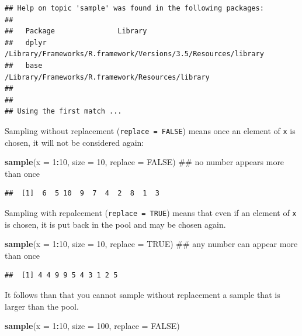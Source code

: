 \documentclass[]{book}
\newenvironment{Shaded}{\begin{snugshade}}{\end{snugshade}}
\newcommand{\KeywordTok}[1]{\textcolor[rgb]{0.13,0.29,0.53}{\textbf{#1}}}
\newcommand{\DataTypeTok}[1]{\textcolor[rgb]{0.13,0.29,0.53}{#1}}
\newcommand{\DecValTok}[1]{\textcolor[rgb]{0.00,0.00,0.81}{#1}}
\newcommand{\OtherTok}[1]{\textcolor[rgb]{0.56,0.35,0.01}{#1}}
\newcommand{\OperatorTok}[1]{\textcolor[rgb]{0.81,0.36,0.00}{\textbf{#1}}}
\newcommand{\NormalTok}[1]{#1}
\theoremstyle{definition}
\theoremstyle{definition}
\theoremstyle{definition}
\theoremstyle{remark}
\begin{document}
\begin{verbatim}
## Help on topic 'sample' was found in the following packages:
## 
##   Package               Library
##   dplyr                 /Library/Frameworks/R.framework/Versions/3.5/Resources/library
##   base                  /Library/Frameworks/R.framework/Resources/library
## 
## 
## Using the first match ...
\end{verbatim}

Sampling without replacement (\texttt{replace\ =\ FALSE}) means once an
element of \texttt{x} is chosen, it will not be considered again:

\begin{Shaded}
\begin{Highlighting}[]
\KeywordTok{sample}\NormalTok{(}\DataTypeTok{x =} \DecValTok{1}\OperatorTok{:}\DecValTok{10}\NormalTok{, }\DataTypeTok{size =} \DecValTok{10}\NormalTok{, }\DataTypeTok{replace =} \OtherTok{FALSE}\NormalTok{) ## no number appears more than once}
\end{Highlighting}
\end{Shaded}

\begin{verbatim}
##  [1]  6  5 10  9  7  4  2  8  1  3
\end{verbatim}

Sampling with repalcement (\texttt{replace\ =\ TRUE}) means that even if
an element of \texttt{x} is chosen, it is put back in the pool and may
be chosen again.

\begin{Shaded}
\begin{Highlighting}[]
\KeywordTok{sample}\NormalTok{(}\DataTypeTok{x =} \DecValTok{1}\OperatorTok{:}\DecValTok{10}\NormalTok{, }\DataTypeTok{size =} \DecValTok{10}\NormalTok{, }\DataTypeTok{replace =} \OtherTok{TRUE}\NormalTok{) ## any number can appear more than once}
\end{Highlighting}
\end{Shaded}

\begin{verbatim}
##  [1] 4 4 9 9 5 4 3 1 2 5
\end{verbatim}

It follows than that you cannot sample without replacement a sample that
is larger than the pool.

\begin{Shaded}
\begin{Highlighting}[]
\KeywordTok{sample}\NormalTok{(}\DataTypeTok{x =} \DecValTok{1}\OperatorTok{:}\DecValTok{10}\NormalTok{, }\DataTypeTok{size =} \DecValTok{100}\NormalTok{, }\DataTypeTok{replace =} \OtherTok{FALSE}\NormalTok{)}
\end{Highlighting}
\end{Shaded}
\end{document}

